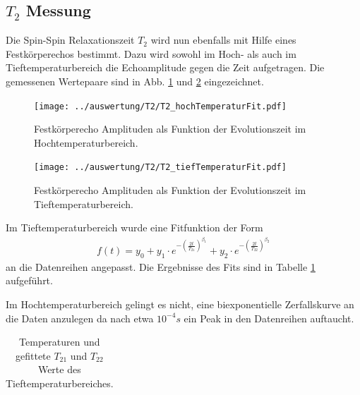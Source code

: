 \subsection{$T_2$ Messung}
Die Spin-Spin Relaxationszeit $T_2$ wird nun ebenfalls mit Hilfe eines Festkörperechos bestimmt. Dazu wird sowohl im Hoch- als auch im Tieftemperaturbereich die Echoamplitude gegen die Zeit aufgetragen. Die gemessenen Wertepaare sind in Abb. \ref{pic_T2_hoch} und \ref{pic_T2_tief} eingezeichnet.
\begin{figure}[htbp]
	\texttt{[image: ../auswertung/T2/T2\_hochTemperaturFit.pdf]}
	\caption{Festkörperecho Amplituden als Funktion der Evolutionszeit im Hochtemperaturbereich.}
	\label{pic_T2_hoch}
\end{figure}
\begin{figure}[htbp]
	\texttt{[image: ../auswertung/T2/T2\_tiefTemperaturFit.pdf]}
	\caption{Festkörperecho Amplituden als Funktion der Evolutionszeit im Tieftemperaturbereich.}
	\label{pic_T2_tief}
\end{figure}

Im Tieftemperaturbereich wurde eine Fitfunktion der Form
\begin{align}
	f(t) = y_0 +
	y_1 \cdot e^{-\left(\frac{2t}{T_{21}}\right)^{\beta_1}} +
	y_2 \cdot e^{-\left(\frac{2t}{T_{22}}\right)^{\beta_2}}
\end{align}
an die Datenreihen angepasst. Die Ergebnisse des Fits sind in Tabelle \ref{tab:T2_tief} aufgeführt.

Im Hochtemperaturbereich gelingt es nicht, eine biexponentielle Zerfallskurve an die Daten anzulegen da nach etwa $10^{-4}s$ ein Peak in den Datenreihen auftaucht.
\begin{table}[htbp]
	\begin{tabular}{| >{$}c<{$} | >{$}c<{$} | >{$}c<{$} |>{$}c<{$} | >{$}c<{$} | >{$}c<{$} | >{$}c<{$} |}
		
	\end{tabular}
	\caption{Temperaturen und gefittete $T_{21}$ und $T_{22}$ Werte des Tieftemperaturbereiches.}
	\label{tab:T2_tief}
\end{table}


\newpage
